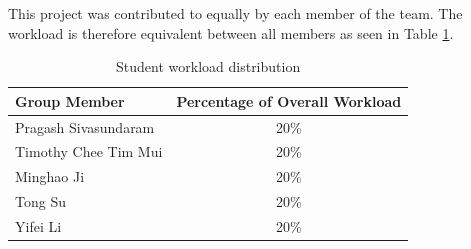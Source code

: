 \documentclass{uw-ece-wkrpt}
\begin{document}
This project was contributed to equally by each member of the team. The workload is therefore equivalent between all members as seen in Table \ref{tab:student_workload}.

\begin{table}[hbp]
\centering
\caption{Student workload distribution}\label{tab:student_workload}
\begin{tabular}{lc}
\toprule
Group Member         & Percentage of Overall Workload \\
\midrule
Pragash Sivasundaram & 20\% \\
Timothy Chee Tim Mui & 20\% \\
Minghao Ji           & 20\% \\
Tong Su              & 20\% \\
Yifei Li             & 20\% \\
\bottomrule
\end{tabular}
\end{table}

\backmatter

\begin{refsection}
\printglossaries
\end{refsection}
\newpage
\printbibliography
{}

\appendix
\end{document}
